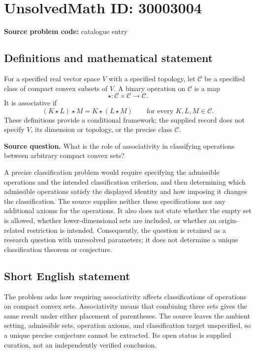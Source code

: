 \documentclass[11pt]{article}
\begin{document}
\section*{UnsolvedMath ID: 30003004}
\textbf{Source problem code:} catalogue entry
\subsection{Definitions and mathematical statement}
For a specified real vector space \(V\) with a specified topology, let \(\mathcal C\) be a specified class of compact convex subsets of \(V\). A binary operation on \(\mathcal C\) is a map
\[
\star:\mathcal C\times\mathcal C\longrightarrow\mathcal C.
\]
It is associative if
\[
(K\star L)\star M=K\star(L\star M)
\qquad\text{for every }K,L,M\in\mathcal C.
\]
These definitions provide a conditional framework; the supplied record does not specify \(V\), its dimension or topology, or the precise class \(\mathcal C\).

\textbf{Source question.} What is the role of associativity in classifying operations between arbitrary compact convex sets?

A precise classification problem would require specifying the admissible operations and the intended classification criterion, and then determining which admissible operations satisfy the displayed identity and how imposing it changes the classification. The source supplies neither these specifications nor any additional axioms for the operations. It also does not state whether the empty set is allowed, whether lower-dimensional sets are included, or whether an origin-related restriction is intended. Consequently, the question is retained as a research question with unresolved parameters; it does not determine a unique classification theorem or conjecture.
\subsection{Short English statement}
The problem asks how requiring associativity affects classifications of operations on compact convex sets. Associativity means that combining three sets gives the same result under either placement of parentheses. The source leaves the ambient setting, admissible sets, operation axioms, and classification target unspecified, so a unique precise conjecture cannot be extracted. Its open status is supplied curation, not an independently verified conclusion.
\end{document}
